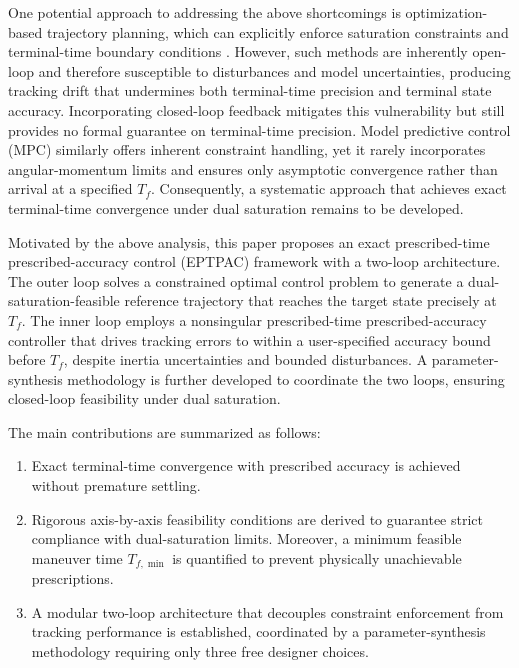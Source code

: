 \documentclass[journal]{new-aiaa}
\begin{document}
One potential approach to addressing the above shortcomings is optimization-based 
trajectory planning, which can explicitly enforce saturation constraints and terminal-time 
boundary conditions 
\cite{kobayashi_optimal_2017,spiller_inverse_2018,celani_spacecraft_2020,fan_polynomial_2024}. 
However, such methods are inherently open-loop and therefore susceptible to disturbances 
and model uncertainties, producing tracking drift that undermines both terminal-time precision 
and terminal state accuracy. 
Incorporating closed-loop feedback 
\cite{chai_six-dof_2020,gong_lyapunov-based_2021} mitigates this vulnerability 
but still provides no formal guarantee on terminal-time precision. 
Model predictive control (MPC) \cite{mammarella_attitude_2019,yang_attitude_2023} 
similarly offers inherent constraint handling, yet it rarely incorporates 
angular-momentum limits and ensures only asymptotic convergence rather than 
arrival at a specified $T_f$.
Consequently, a systematic approach that achieves exact terminal-time convergence 
under dual saturation remains to be developed.

Motivated by the above analysis, this paper proposes an exact prescribed-time 
prescribed-accuracy control (EPTPAC) framework with a two-loop architecture. 
The outer loop solves a constrained optimal control problem to 
generate a dual-saturation-feasible reference trajectory that reaches the target state 
precisely at $T_f$. The inner loop employs a nonsingular prescribed-time 
prescribed-accuracy controller that drives tracking errors to within a user-specified 
accuracy bound before $T_f$, despite inertia uncertainties and bounded disturbances. 
A parameter-synthesis methodology is further developed 
to coordinate the two loops, ensuring closed-loop feasibility under dual saturation.

The main contributions are summarized as follows:
\begin{enumerate}
  \item Exact terminal-time convergence with prescribed accuracy is achieved 
  without premature settling.
  \item Rigorous axis-by-axis feasibility conditions are derived to guarantee strict compliance 
  with dual-saturation limits. Moreover, a minimum feasible maneuver time $T_{f,\min}$ is 
  quantified to prevent physically unachievable prescriptions.
  \item A modular two-loop architecture that decouples constraint enforcement 
  from tracking performance is established, coordinated by a parameter-synthesis 
  methodology requiring only three free designer choices.
\end{enumerate}
\end{document}
